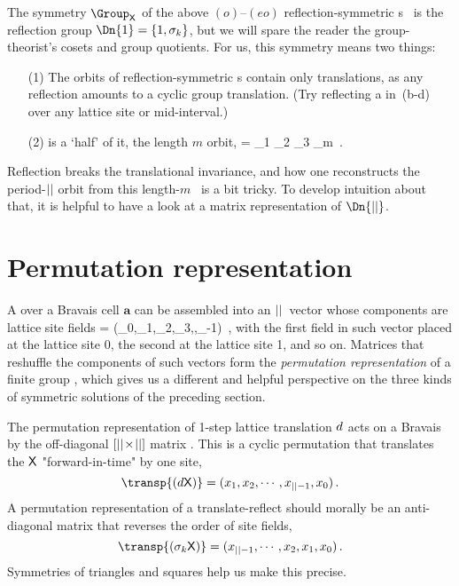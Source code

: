 The {\lattstate} {symmetry} $\Group_\Xx$  of the
above $(o)$--$(eo)$ reflection-symmetric {\lattstate}s \Xx\ is the reflection
group $\Dn{1}=\{1,\Refl_k\}$, but we will spare the reader the
group-theorist's cosets and group quotients. For us, this symmetry means
two things:
\begin{itemize}
  \item[(1)]
The \Dn{\infty} orbits of reflection-symmetric {\lattstate}s contain only
translations, as any reflection amounts to a cyclic group
\Cn{\cl{}} translation.
(Try reflecting a  {\lattstate} in \,(b-d)
over any lattice site or mid-interval.)
  \item[(2)]
{\lattstate} is a `half' of it, the length ${m}$ orbit,
\beq
\tilde{\Xx}      = \ssp_1 \ssp_2 \ssp_3 \cdots \ssp_{m}
\,.


\end{itemize}
Reflection breaks the translational invariance, and how one reconstructs
the period-${||}$ orbit from this length-$m$ \brick\ is a bit tricky. To
develop intuition about that, it is helpful to have a look at a matrix
representation of $\Dn{\cl{}}$.

\section{Permutation representation}
\label{sect:permReps}

A {\lattstate} {\Xx} over a Bravais cell $\mathbf{a}$ can be assembled
into an ${||}$\dmn\ vector whose components are lattice site fields
\beq
\transp{\Xx} = (\ssp_0,\ssp_1,\ssp_2,\ssp_3,\cdots,\ssp_{\cl{}-1})
\,,
with the first field in such vector placed at the lattice site 0, the
second at the lattice site 1, and so on. Matrices that reshuffle the
components of such vectors form the {\em permutation representation} of a
finite group \Group, which gives us a different and helpful
perspective on the three kinds of symmetric solutions of the preceding
section.

The permutation representation of 1-step lattice translation $d$
acts on a Bravais {\lattstate} by the off-diagonal
$[{||}\!\times\!{||}]$ matrix . This is a cyclic
\Cn{\cl{}} permutation that translates the {\lattstate} $\mathsf{X}$
"forward-in-time" by one site,
\[
\transp{(\shift\Xx)}=(\ssp_1,\ssp_2,\cdots,\ssp_{\cl{}-1},\ssp_0)
\,.
\]
A permutation representation of a \Dn{\cl{}} translate-reflect should
morally be an anti-diagonal matrix that reverses the order of site
fields,
\[
\transp{(\Refl_k\Xx)}=(\ssp_{\cl{}-1},\cdots,\ssp_2,\ssp_1,\ssp_0)
\,.
\]
Symmetries of triangles and squares help us make this precise.

